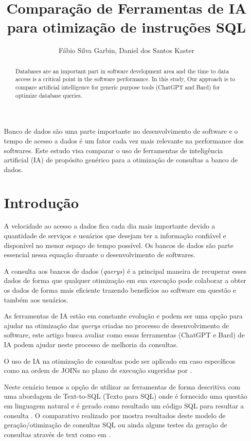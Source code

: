 \documentclass[12pt]{article}
\title{Comparação de Ferramentas de IA para otimização de instruções SQL}
\author{Fábio Silva Garbin\inst{1}, Daniel dos Santos Kaster\inst{1} }
\begin{document}
 
\maketitle

\begin{abstract}
Databases are an important part in software development area and
the time to data access is a critical point in the software performance. In this
study, Our approach is to compare artificial intelligence for generic purpose tools (ChatGPT and Bard) for optimize
database queries.
\end{abstract}
     
\begin{resumo} 
Banco de dados são uma parte importante no desenvolvimento de
software e o tempo de acesso a dados é um fator cada vez mais relevante na
performance dos softwares. Este estudo visa comparar o uso de ferramentas
de inteligência artificial (IA) de propósito genérico para a otimização de
consultas a banco de dados.
\end{resumo}


\section{Introdução}
A velocidade ao acesso a dados fica cada dia mais importante devido a quantidade de
serviços e usuários que desejam ter a informação confiável e disponível no menor
espaço de tempo possível. Os bancos de dados são parte essencial nessa equação
durante o desenvolvimento de softwares.

A consulta aos bancos de dados (\emph{querys}) é a principal maneira de recuperar esses dados de
forma que qualquer otimização em sua execução pode colaborar a obter os dados de
forma mais eficiente trazendo benefícios ao software em questão e também aos
usuários.

As ferramentas de IA estão em constante evolução e podem ser uma opção para ajudar na otimização das \emph{querys} criadas no processo de desenvolvimento de software, este artigo busca avaliar como essas ferramentas (ChatGPT e Bard) de IA podem ajudar neste processo de melhoria da consultas.

O uso de IA na otimização de consultas pode ser aplicado em caso específicos como na ordem de JOINs no plano de execução sugeridas por \cite{robinson2014cost}.

Neste cenário temos a opção de utilizar as ferramentas de forma descritiva com uma abordagem de Text-to-SQL (Texto para SQL) onde é fornecido uma questão em linguagem natural e é gerado como resultado um código SQL para resultar a consulta \cite{li2023can}. O comparativo realizado por \cite{linkedin_compare_texttosql} mostra resultados deste modelo de geração/otimização de consultas SQL ou ainda alguns testes da geração de consultas através de text como em \cite{devblogs_microsoft}.
\end{document}
